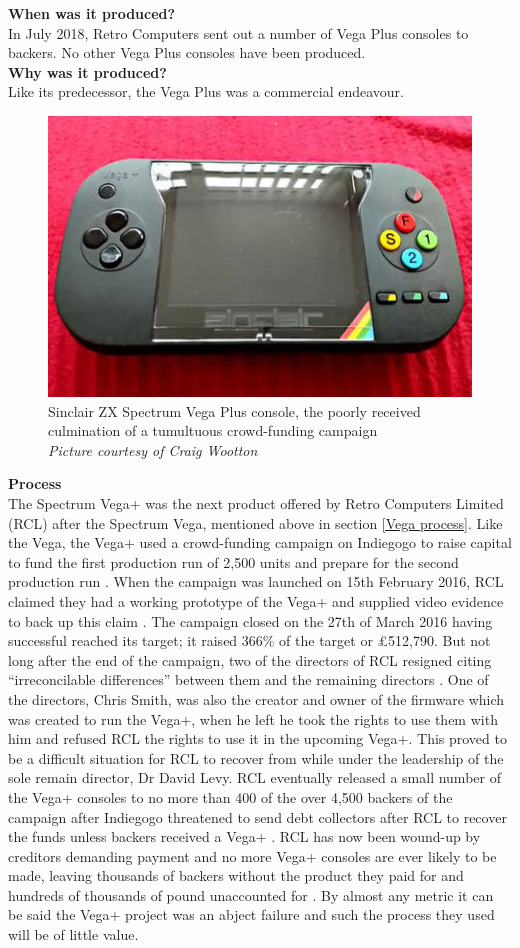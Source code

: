 \textbf{When was it produced?}\\
In July 2018, Retro Computers sent out a number of Vega Plus consoles to backers. No other Vega Plus consoles have been produced.\\

\textbf{Why was it produced?}\\
Like its predecessor, the Vega Plus was a commercial endeavour. \\

\begin{figure} \begin{center}
\includegraphics[width=.3\linewidth]{pics/Spectrum_vega_plus} 
\end{center} 
\caption{Sinclair ZX Spectrum Vega Plus console, the poorly received culmination of a tumultuous crowd-funding campaign  \\ \textit{\small{Picture courtesy of Craig Wootton}}}
\label{Spectrum_Vega_Plus}
\end{figure} 

\textbf{Process}\\
The Spectrum Vega+ was the next product offered by Retro Computers Limited (RCL) after the Spectrum Vega, mentioned above in section \ref{Vega process}. Like the Vega, the Vega+ used a crowd-funding campaign on Indiegogo to raise capital to fund the first production run of 2,500 units and prepare for the second production run 
\cite{RN143}. When the campaign was launched on 15th February 2016, RCL claimed they had a working prototype of the Vega+ and supplied video evidence to back up this claim 
\cite{RN145}\cite{RN143}. The campaign closed on the 27th of March 2016 having successful reached its target; it raised 366\% of the target or \pounds 512,790. 
But not long after the end of the campaign, two of the directors of RCL resigned citing ``irreconcilable differences'' between them and the remaining directors
\cite{RN146}. One of the directors, Chris Smith, was also the creator and owner of the firmware which was created to run the Vega+, when he left he took the rights to use them with him and refused RCL the rights to use it in the upcoming Vega+. This proved to be a difficult situation for RCL to recover from while under the leadership of the sole remain director, Dr David Levy. RCL eventually released a small number of the Vega+ consoles to no more than 400 of the over 4,500 backers of the campaign after Indiegogo threatened to send debt collectors after RCL to recover the funds unless backers received a Vega+ 
\cite{RN147}. RCL has now been wound-up by creditors demanding payment and no more Vega+ consoles are ever likely to be made, leaving thousands of backers without the product they paid for and hundreds of thousands of pound unaccounted for 
\cite{RN120}\cite{RN148}. By almost any metric it can be said the Vega+ project was an abject failure and such the process they used will be of little value. \\

